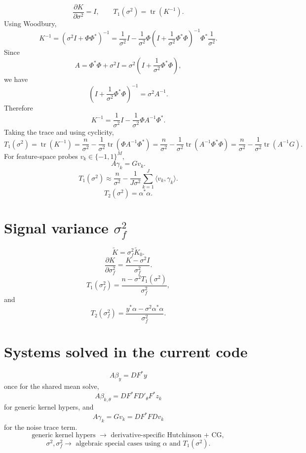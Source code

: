 \documentclass[11pt]{article}
\begin{document}
\[
\frac{\partial K}{\partial \sigma^2} = I,
\qquad
T_1(\sigma^2) = \operatorname{tr}(K^{-1}).
\]
Using Woodbury,
\[
K^{-1}
=
\left(\sigma^2 I + \Phi \Phi^\ast\right)^{-1}
=
\frac{1}{\sigma^2}I
-
\frac{1}{\sigma^2}\Phi
\left(I + \frac{1}{\sigma^2}\Phi^\ast \Phi\right)^{-1}
\Phi^\ast
\frac{1}{\sigma^2}.
\]
Since
\[
A = \Phi^\ast \Phi + \sigma^2 I
=
\sigma^2\left(I + \frac{1}{\sigma^2}\Phi^\ast \Phi\right),
\]
we have
\[
\left(I + \frac{1}{\sigma^2}\Phi^\ast \Phi\right)^{-1}
=
\sigma^2 A^{-1}.
\]
Therefore
\[
K^{-1}
=
\frac{1}{\sigma^2}I
-
\frac{1}{\sigma^2}\Phi A^{-1}\Phi^\ast.
\]
Taking the trace and using cyclicity,
\[
T_1(\sigma^2)
=
\operatorname{tr}(K^{-1})
=
\frac{n}{\sigma^2}
-
\frac{1}{\sigma^2}\operatorname{tr}(\Phi A^{-1}\Phi^\ast)
=
\frac{n}{\sigma^2}
-
\frac{1}{\sigma^2}\operatorname{tr}(A^{-1}\Phi^\ast \Phi)
=
\frac{n}{\sigma^2}
-
\frac{1}{\sigma^2}\operatorname{tr}(A^{-1}G).
\]
For feature-space probes $v_k \in \{-1,1\}^M$,
\[
A \gamma_k = G v_k.
\]
\[
T_1(\sigma^2)
\approx
\frac{n}{\sigma^2}
-
\frac{1}{J \sigma^2}\sum_{k=1}^J \langle v_k, \gamma_k \rangle.
\]
\[
T_2(\sigma^2) = \alpha^\ast \alpha.
\]

\section*{Signal variance $\sigma_f^2$}

\[
\widetilde K = \sigma_f^2 \widetilde K_0.
\]
\[
\frac{\partial K}{\partial \sigma_f^2}
=
\frac{K - \sigma^2 I}{\sigma_f^2}.
\]
\[
T_1(\sigma_f^2)
=
\frac{n - \sigma^2 T_1(\sigma^2)}{\sigma_f^2},
\]
and
\[
T_2(\sigma_f^2)
=
\frac{y^\ast \alpha - \sigma^2 \alpha^\ast \alpha}{\sigma_f^2}.
\]

\section*{Systems solved in the current code}

\[
A \beta_y = D F^\ast y
\]
once for the shared mean solve,
\[
A \beta_{k,\theta} = D F^\ast F D'_\theta F^\ast z_k
\]
for generic kernel hypers,
and
\[
A \gamma_k = G v_k = D F^\ast F D v_k
\]
for the noise trace term.
\[
\text{generic kernel hypers } \to \text{ derivative-specific Hutchinson + CG},
\]
\[
\sigma^2,\sigma_f^2 \to \text{ algebraic special cases using } \alpha \text{ and } T_1(\sigma^2).
\]
\end{document}
